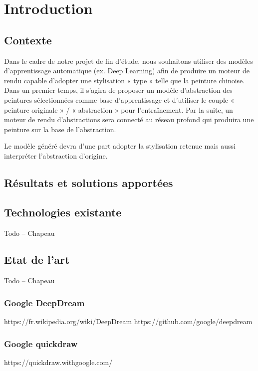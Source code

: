 \documentclass[a4paper, 12pt]{book}
\begin{document}
\mainmatter
\chapter*{Introduction}

\section{Contexte}
Dans le cadre de notre projet de fin d'étude, nous souhaitons utiliser des modèles d’apprentissage automatique (ex. Deep Learning) afin de produire un moteur de rendu capable d’adopter une stylisation « type » telle que la peinture chinoise. Dans un premier temps, il s’agira de proposer un modèle d’abstraction des peintures sélectionnées comme base d’apprentissage et d’utiliser le couple « peinture originale » / « abstraction » pour l’entraînement. Par la suite, un moteur de rendu d’abstractions sera connecté au réseau profond qui produira une peinture sur la base de l’abstraction.

Le modèle généré devra d'une part adopter la stylisation retenue mais aussi interpréter l'abstraction d'origine.

\section{Résultats et solutions apportées}


\section{Technologies existante}
Todo -- Chapeau


\section{Etat de l'art}
Todo -- Chapeau

\subsection{Google DeepDream}
https://fr.wikipedia.org/wiki/DeepDream
https://github.com/google/deepdream

\subsection{Google quickdraw}
https://quickdraw.withgoogle.com/
\end{document}
